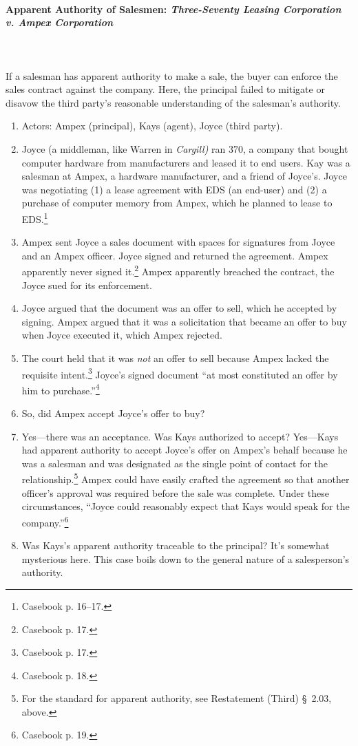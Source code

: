 \paragraph{Apparent Authority of Salesmen: \emph{Three-Seventy Leasing 
Corporation v. Ampex Corporation}}
~\\\\
If a salesman has apparent authority to make a sale, the buyer can enforce the 
sales contract against the company. Here, the principal failed to mitigate or 
disavow the third party's reasonable understanding of the salesman's 
authority.


\begin{enumerate}
    \item Actors: Ampex (principal), Kays (agent), Joyce (third party).
    \item Joyce (a middleman, like Warren in \emph{Cargill)} ran 370, a 
    company that bought computer hardware from manufacturers and leased it to 
    end users. Kay was a salesman at Ampex, a hardware manufacturer, and a 
    friend of Joyce's. Joyce was negotiating (1) a lease agreement with EDS 
    (an end-user) and (2) a purchase of computer memory from Ampex, which he 
    planned to lease to EDS.\footnote{Casebook p.  16--17.}
    \item Ampex sent Joyce a sales document with spaces for signatures from 
    Joyce and an Ampex officer. Joyce signed and returned the agreement. Ampex 
    apparently never signed it.\footnote{Casebook p. 17.} Ampex apparently 
    breached the contract, the Joyce sued for its enforcement.
    \item Joyce argued that the document was an offer to sell, which he 
    accepted by signing. Ampex argued that it was a solicitation that became 
    an offer to buy when Joyce executed it, which Ampex rejected.
    \item The court held that it was \emph{not} an offer to sell because Ampex 
    lacked the requisite intent.\footnote{Casebook p. 17.} Joyce's signed 
    document ``at most constituted an offer by him to 
    purchase.''\footnote{Casebook p. 18.}
    \item So, did Ampex accept Joyce's offer to buy?
    \item Yes---there was an acceptance. Was Kays authorized to accept? 
    Yes---Kays had apparent authority to accept Joyce's offer on Ampex's 
    behalf because he was a salesman and was designated as the single point of 
    contact for the relationship.\footnote{For the standard for apparent 
    authority, see Restatement (Third) \S\ 2.03, above.} Ampex could have 
    easily crafted the agreement so that another officer's approval was 
    required before the sale was complete. Under these circumstances, ``Joyce 
    could reasonably expect that Kays would speak for the 
    company.''\footnote{Casebook p. 19.}
    \item Was Kays's apparent authority traceable to the principal? It's 
    somewhat mysterious here. This case boils down to the general nature of a 
    salesperson's authority.
\end{enumerate}

